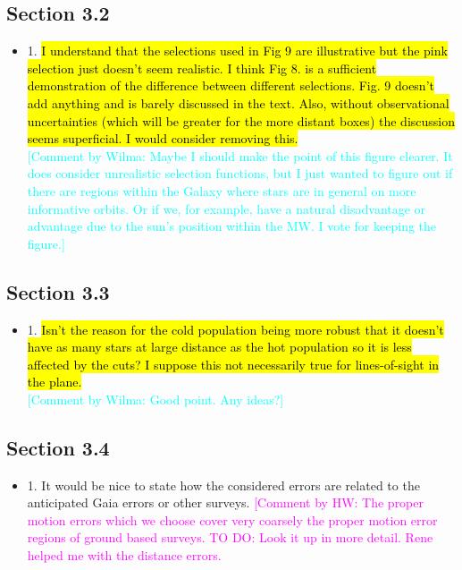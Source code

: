 \documentclass[10pt,a4paper]{article}
\newcommand{\Wilma}[1]{\textcolor{Magenta}{#1}}
\newcommand{\HW}[1]{\textcolor{Cyan}{#1}}
\begin{document}
\subsection{Section 3.2}
\begin{itemize}
\item 1. \hl{I understand that the selections used in Fig 9 are illustrative but the pink selection just doesn't seem realistic. I think Fig 8. is a sufficient demonstration of the difference between different selections. Fig. 9 doesn't add anything and is barely discussed in the text. Also, without observational uncertainties (which will be greater for the more distant boxes) the discussion seems superficial. I would consider removing this.}\\
\HW{[Comment by Wilma: Maybe I should make the point of this figure clearer. It does consider unrealistic selection functions, but I just wanted to figure out if there are regions within the Galaxy where stars are in general on more informative orbits. Or if we, for example, have a natural disadvantage or advantage due to the sun's position within the MW. I vote for keeping the figure.]}
\end{itemize}

\subsection{Section 3.3}
\begin{itemize}
\item 1. \hl{Isn't the reason for the cold population being more robust that it doesn't have as many stars at large distance as the hot population so it is less affected by the cuts? I suppose this not necessarily true for lines-of-sight in the plane.}\\
\HW{[Comment by Wilma: Good point. Any ideas?]}
\end{itemize}

\subsection{Section 3.4}
\begin{itemize}
\item 1. It would be nice to state how the considered errors are related to the anticipated Gaia errors or other surveys. \Wilma{[Comment by HW: The proper motion errors which we choose cover very coarsely the proper motion error regions of ground based surveys. TO DO: Look it up in more detail. Rene helped me with the distance errors.}
\end{itemize}
\end{document}
